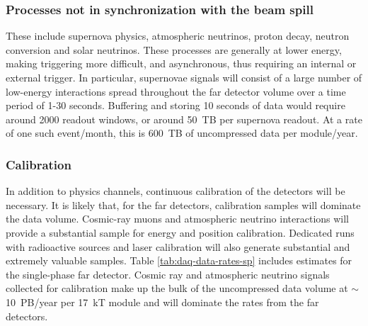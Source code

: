 \subsubsection{Processes not in synchronization with the beam spill} These include supernova physics, atmospheric neutrinos, proton decay, neutron conversion and solar neutrinos.  These processes are generally at lower energy, making triggering more difficult, and asynchronous, thus requiring an internal or external trigger.  In particular, supernovae signals will consist of a large number of low-energy interactions spread throughout the far detector volume over a time period of 1-30 seconds. Buffering and storing 10 seconds of data would require around 2000 readout windows, or around 50~TB per supernova readout.  At a rate of one such event/month, this is 600~TB of uncompressed data per module/year.

\subsubsection{
Calibration}
In addition to physics channels, continuous calibration of the detectors will be necessary.  It is likely that, for the far detectors, calibration samples will  dominate the data volume. Cosmic-ray muons and atmospheric neutrino interactions will provide a substantial sample for energy and position calibration.  Dedicated runs with radioactive sources and laser calibration will also generate substantial and extremely valuable samples. Table \ref{tab:daq-data-rates-sp} includes estimates for the single-phase far detector.   Cosmic ray and atmospheric neutrino signals collected for calibration make up the bulk of the uncompressed  data volume at $\sim$10~PB/year per 17~kT module and will dominate the rates from the far detectors.  %








